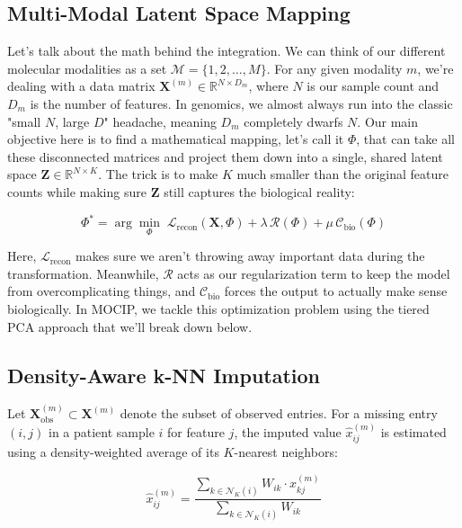 \documentclass[12pt,a4paper,onecolumn]{article}
\begin{document}
\subsection{Multi-Modal Latent Space Mapping}
Let's talk about the math behind the integration. We can think of our different molecular modalities as a set $\mathcal{M} = \{1, 2, \ldots, M\}$. For any given modality $m$, we're dealing with a data matrix $\mathbf{X}^{(m)} \in \mathbb{R}^{N \times D_m}$, where $N$ is our sample count and $D_m$ is the number of features. In genomics, we almost always run into the classic "small $N$, large $D$" headache, meaning $D_m$ completely dwarfs $N$. Our main objective here is to find a mathematical mapping, let's call it $\Phi$, that can take all these disconnected matrices and project them down into a single, shared latent space $\mathbf{Z} \in \mathbb{R}^{N \times K}$. The trick is to make $K$ much smaller than the original feature counts while making sure $\mathbf{Z}$ still captures the biological reality:

\begin{equation}
\Phi^{*} = \arg\min_{\Phi} \; \mathcal{L}_{\text{recon}}(\mathbf{X}, \Phi) + \lambda \, \mathcal{R}(\Phi) + \mu \, \mathcal{C}_{\text{bio}}(\Phi)
\end{equation}

Here, $\mathcal{L}_{\text{recon}}$ makes sure we aren't throwing away important data during the transformation. Meanwhile, $\mathcal{R}$ acts as our regularization term to keep the model from overcomplicating things, and $\mathcal{C}_{\text{bio}}$ forces the output to actually make sense biologically. In MOCIP, we tackle this optimization problem using the tiered PCA approach that we'll break down below.

\subsection{Density-Aware k-NN Imputation}
Let $\mathbf{X}^{(m)}_{\text{obs}} \subset \mathbf{X}^{(m)}$ denote the subset of observed entries. For a missing entry $(i, j)$ in a patient sample $i$ for feature $j$, the imputed value $\hat{x}^{(m)}_{ij}$ is estimated using a density-weighted average of its $K$-nearest neighbors:

\begin{equation}
\hat{x}^{(m)}_{ij} = \frac{\sum_{k \in \mathcal{N}_K(i)} W_{ik} \cdot x^{(m)}_{kj}}{\sum_{k \in \mathcal{N}_K(i)} W_{ik}}
\end{equation}
\end{document}
